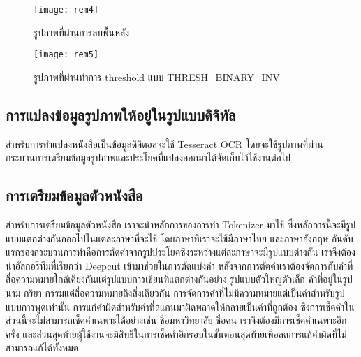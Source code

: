 \begin{figure}[H]
    \centering
    \texttt{[image: rem4]}
    \caption{รูปภาพที่ผ่านการลบพื้นหลัง}\label{fig:rem4}
\end{figure}

\begin{figure}[H]
    \centering
    \texttt{[image: rem5]}
    \caption{รูปภาพที่ผ่านทำการ threshold แบบ THRESH\_BINARY\_INV}\label{fig:rem5}
\end{figure}


\subsection{การแปลงข้อมูลรูปภาพให้อยู่ในรูปแบบดิจิทัล}

สำหรับการทำแปลงหนังสือเป็นข้อมูลดิจิตอลจะใช้ Tesseract OCR โดยจะใช้รูปภาพที่ผ่านกระบวนการเตรียมข้อมูลรูปภาพและประโยคที่แปลงออกมาได้จัดเก็บไว้ใช้งานต่อไป

\subsection{การเตรียมข้อมูลตัวหนังสือ}

สำหรับการเตรียมข้อมูลตัวหนังสือ เราจะนำหลักการของการทำ Tokenizer มาใช้ ซึ่งหลักการนี้จะมีรูปแบบแตกต่างกันออกไปในแต่ละภาษาที่จะใช้ โดยภาษาที่เราจะใช้มีภาษาไทย และภาษาอังกฤษ อันดับแรกของกระบวนการทำคือการตัดคำจากรูปประโยคซึ่งระหว่างแต่ละภาษาจะมีรูปแบบต่างกัน เราจึงต้องนำอัลกอรึทึมที่เรียกว่า Deepcut เข้ามาช่วยในการตัดแบ่งคำ หลังจากการตัดคำเราต้องจัดการกับคำที่สื่อความหมายใกล้เคียงกันแต่รูปแบบการเขียนที่แตกต่างกันอย่าง รูปแบบตัวใหญ่ตัวเล็ก คำที่อยู่ในรูปนาม กริยา กรรมแต่สื่อความหมายถึงสิ่งเดียวกัน การจัดการคำที่ไม่มีความหมายแต่เป็นคำสำหรับรูปแบบการพูดเท่านั้น การแก้คำผิดสำหรับคำที่สแกนมาผิดพลาดให้กลายเป็นคำที่ถูกต้อง ซึ่งการเช็คคำในส่วนนี้จะไม่สามารถเช็คคำเฉพาะได้อย่างเช่น ชื่อมหาวิทยาลัย ชื่อคน เราจึงต้องมีการเช็คคำเฉพาะอีกครั้ง และส่วนสุดท้ายผู้ใช้งานจะมีสิทธิในการเช็คคำอีกรอบในขั้นตอนสุดท้ายเพื่อลดการแก้คำผิดที่ไม่สามารถแก้ได้ทั้งหมด

